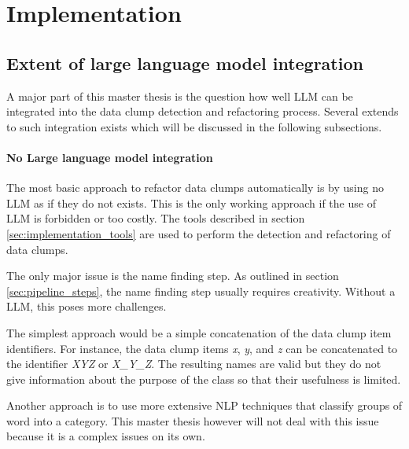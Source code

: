 
\begingroup
\renewcommand{\cleardoublepage}{} %
\renewcommand{\clearpage}{}
\chapter{Implementation}\label{chapter:implementation}
\endgroup














\section{Extent of large language model integration}

A major part of this master thesis is the question how well \ac{LLM} can be integrated into the data clump  detection and refactoring process. Several extends to such integration exists which will be discussed in the following subsections. 

\subsubsection{No Large language model integration}

The most basic approach to refactor data clumps automatically is by using no \ac{LLM} as if they do not exists. This is the only working approach if the use of  \ac{LLM} is forbidden or too costly. The tools described in section \ref{sec:implementation_tools} are used to perform the detection and refactoring of data clumps. 

The only major issue is the name finding step. As outlined in section \ref{sec:pipeline_steps}, the name finding step usually requires creativity. Without a \ac{LLM}, this poses more challenges.

The simplest approach would be a simple concatenation of the data clump item identifiers. For instance, the data clump items \textit{x}, \textit{y}, and \textit{z} can be concatenated to  the identifier \textit{XYZ} or \textit{X\_Y\_Z}. The resulting names are valid but they do not give information about the purpose of the class so that their usefulness is limited.

Another approach is to use more extensive \ac{NLP} techniques that classify groups of word into a category. This master thesis however will not deal with this issue because it is a complex issues on its own.

